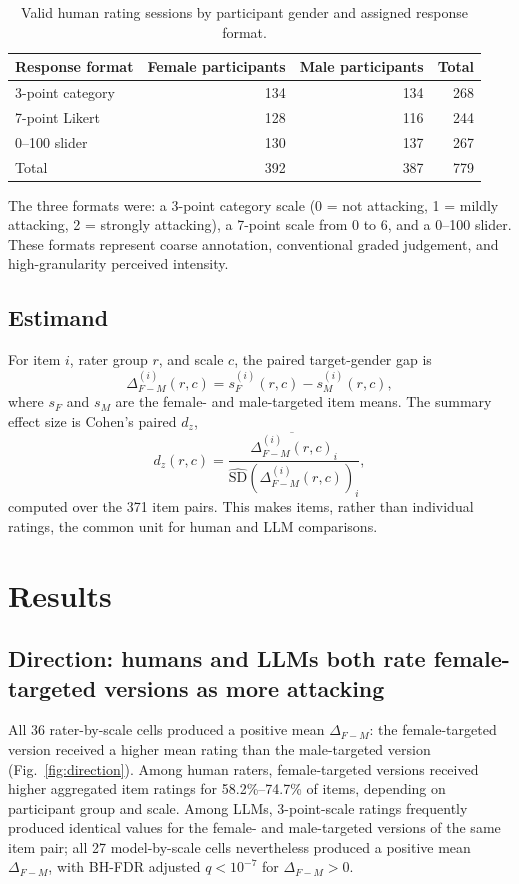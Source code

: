 \documentclass[runningheads]{llncs}
\begin{document}
\begin{table}[t]
  \centering
  \small
  \caption{Valid human rating sessions by participant gender and assigned response format.}
  \label{tab:human-balance}
  \begin{tabular}{lrrr}
    \toprule
    Response format & Female participants & Male participants & Total \\
    \midrule
    3-point category & 134 & 134 & 268 \\
    7-point Likert & 128 & 116 & 244 \\
    0--100 slider & 130 & 137 & 267 \\
    \midrule
    Total & 392 & 387 & 779 \\
    \bottomrule
  \end{tabular}
\end{table}

The three formats were: a 3-point category scale (0 = not attacking, 1 = mildly attacking, 2 = strongly attacking), a 7-point scale from 0 to 6, and a 0--100 slider. These formats represent coarse annotation, conventional graded judgement, and high-granularity perceived intensity.

\subsection{Estimand}

For item $i$, rater group $r$, and scale $c$, the paired target-gender gap is
\[
  \Delta^{(i)}_{F-M}(r,c)=s^{(i)}_F(r,c)-s^{(i)}_M(r,c),
\]
where $s_F$ and $s_M$ are the female- and male-targeted item means. The summary effect size is Cohen's paired $d_z$,
\[
  d_z(r,c)=
  \frac{\overline{\Delta^{(i)}_{F-M}(r,c)}_i}
  {\widehat{\mathrm{SD}}\left(\Delta^{(i)}_{F-M}(r,c)\right)_i},
\]
computed over the 371 item pairs. This makes items, rather than individual ratings, the common unit for human and LLM comparisons.

\section{Results}

\subsection{Direction: humans and LLMs both rate female-targeted versions as more attacking}
\label{sec:r-direction}

All 36 rater-by-scale cells produced a positive mean $\Delta_{F-M}$: the female-targeted version received a higher mean rating than the male-targeted version (Fig.~\ref{fig:direction}). Among human raters, female-targeted versions received higher aggregated item ratings for 58.2\%--74.7\% of items, depending on participant group and scale. Among LLMs, 3-point-scale ratings frequently produced identical values for the female- and male-targeted versions of the same item pair; all 27 model-by-scale cells nevertheless produced a positive mean $\Delta_{F-M}$, with BH-FDR adjusted $q<10^{-7}$ for $\Delta_{F-M}>0$.
\end{document}

